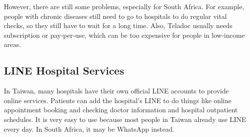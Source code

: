 However, there are still some problems, especially for South Africa. For example, people with chronic diseases still need to go to hospitals to do regular vital checks, so they still have to wait for a long time. Also, Teladoc usually needs subscription or pay-per-use, which can be too expensive for people in low-income areas.

\subsection{LINE Hospital Services}

In Taiwan, many hospitals have their own official LINE accounts to provide online services. Patients can add the hospital’s LINE to do things like online appointment booking and checking doctor information and hospital outpatient schedules. It is very easy to use because most people in Taiwan already use LINE every day. In South Africa, it may be WhatsApp instead. 

